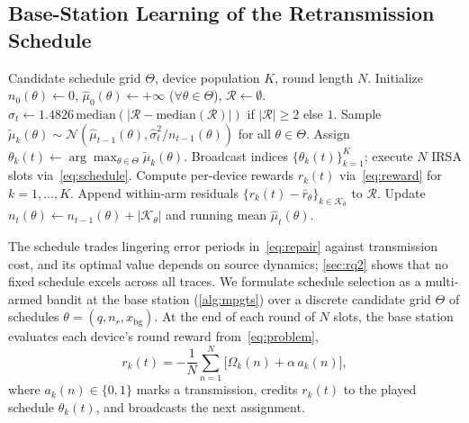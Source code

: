 \documentclass[conference]{IEEEtran}
\begin{document}
\subsection{Base-Station Learning of the Retransmission Schedule}
\label{sec:learn}
  \begin{algorithm}[t]
    \caption{\tool Schedule Learning at the Base Station}
    \label{alg:mpgts}
    \footnotesize
    \begin{algorithmic}[1]
      \REQUIRE Candidate schedule grid $\Theta$, device population $K$, round length $N$.
      \STATE Initialize $n_0(\theta) \leftarrow 0$, $\hat\mu_0(\theta) \leftarrow +\infty$ ($\forall \theta \in \Theta$), $\mathcal{R} \leftarrow \emptyset$.
        \STATE $\hat\sigma_t \leftarrow 1.4826\,\mathrm{median}(|\mathcal{R} - \mathrm{median}(\mathcal{R})|)$ if $|\mathcal{R}| \ge 2$ else $1$.
          \STATE Sample $\tilde\mu_k(\theta) \sim \mathcal{N}(\hat\mu_{t-1}(\theta), \hat\sigma_t^2 / n_{t-1}(\theta))$ for all $\theta \in \Theta$.
          \STATE Assign $\theta_k(t) \leftarrow \arg\max_{\theta \in \Theta} \tilde\mu_k(\theta)$.
        \ENDFOR
        \STATE Broadcast indices $\{\theta_k(t)\}_{k=1}^K$; execute $N$ IRSA slots via~\eqref{eq:schedule}.
        \STATE Compute per-device rewards $r_k(t)$ via~\eqref{eq:reward} for $k = 1, \dots, K$.
          \STATE Append within-arm residuals $\{r_k(t) - \bar r_\theta\}_{k \in \mathcal{K}_\theta}$ to $\mathcal{R}$.
          \STATE Update $n_t(\theta) \leftarrow n_{t-1}(\theta) + |\mathcal{K}_\theta|$ and running mean $\hat\mu_t(\theta)$.
        \ENDFOR
      \ENDFOR
    \end{algorithmic}
  \end{algorithm}

  The schedule trades lingering error periods in~\eqref{eq:repair} against transmission cost, and its optimal value depends on source dynamics; \autoref{sec:rq2} shows that no fixed schedule excels across all traces.
  We formulate schedule selection as a multi-armed bandit at the base station (\autoref{alg:mpgts}) over a discrete candidate grid $\Theta$ of schedules $\theta = (q, n_r, x_{\mathrm{bg}})$.
  At the end of each round of $N$ slots, the base station evaluates each device's round reward from~\eqref{eq:problem},
  \begin{equation}
    r_k(t) = - \frac{1}{N} \sum_{n=1}^{N} \big[\Omega_k(n) + \alpha\, a_k(n)\big],
    \label{eq:reward}
  \end{equation}
  where $a_k(n) \in \{0, 1\}$ marks a transmission, credits $r_k(t)$ to the played schedule $\theta_k(t)$, and broadcasts the next assignment.
\end{document}
